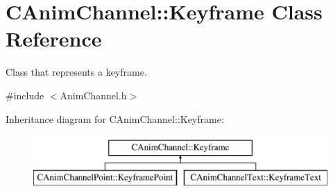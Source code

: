 \hypertarget{class_c_anim_channel_1_1_keyframe}{\section{C\+Anim\+Channel\+:\+:Keyframe Class Reference}
\label{class_c_anim_channel_1_1_keyframe}
}


Class that represents a keyframe.  




{\ttfamily \#include $<$Anim\+Channel.\+h$>$}

Inheritance diagram for C\+Anim\+Channel\+:\+:Keyframe\+:\begin{figure}[H]
\begin{center}
\leavevmode
\includegraphics[height=2.000000cm]{class_c_anim_channel_1_1_keyframe}
\end{center}
\end{figure}
